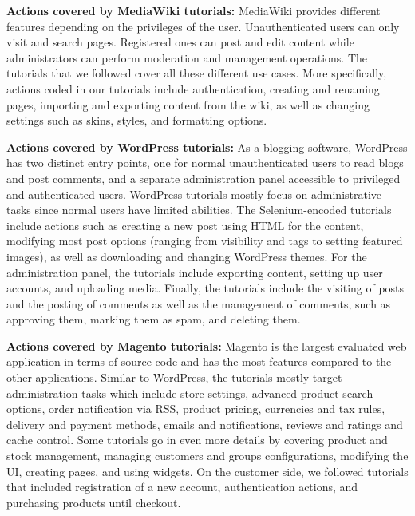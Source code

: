 \vspace{0.5ex}

\noindent \textbf{Actions covered by MediaWiki tutorials:} MediaWiki provides different features depending on the privileges of the user.
Unauthenticated users can only visit and search pages.
Registered ones can post and edit content while administrators can perform moderation and management operations.
The tutorials that we followed cover all these different use cases.
More specifically, actions coded in our tutorials include authentication, creating and renaming pages, importing and exporting content from the wiki, as well as changing settings such as skins, styles, and formatting options.

\vspace{0.5ex}

\noindent \textbf{Actions covered by WordPress tutorials:} As a blogging software, WordPress has two distinct entry points, one for normal unauthenticated users to read blogs and post comments, and a separate administration panel accessible to privileged and authenticated users.
WordPress tutorials mostly focus on administrative tasks since normal users have limited abilities. The Selenium-encoded tutorials include actions such as creating a new post using HTML for the content, modifying most post options (ranging from visibility and tags to setting featured images), as well as downloading and changing WordPress themes.
For the administration panel, the tutorials include exporting content, setting up user accounts, and uploading media. Finally, the tutorials include the visiting of posts and the posting of comments as well as the management of comments, such as approving them, marking them as spam, and deleting them.
\vspace{0.5ex}

\noindent \textbf{Actions covered by Magento tutorials:} Magento is the largest evaluated web application in terms of source code and has the most features compared to the other applications. Similar to WordPress, the tutorials mostly target administration tasks which include store settings, advanced product search options, order notification via RSS, product pricing, currencies and tax rules, delivery and payment methods, emails and notifications, reviews and ratings and cache control. Some tutorials go in even more details by covering product and stock management, managing customers and groups configurations, modifying the UI, creating pages, and using widgets.
On the customer side, we followed tutorials that included registration of a new account, authentication actions, and purchasing products until checkout.

